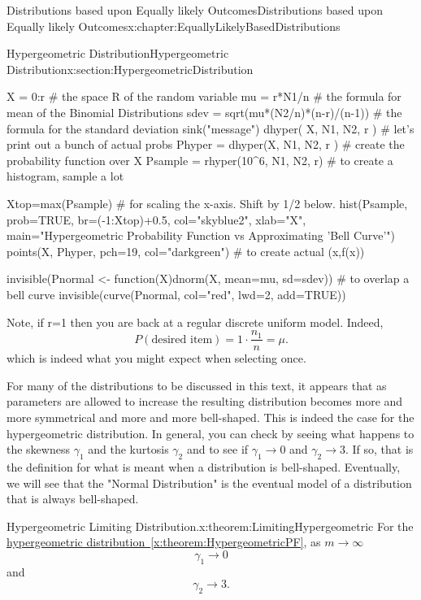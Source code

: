 \documentclass[oneside,10pt,]{book}
\newcommand{\xreffont}{\relax}
\numberwithin{equation}{section}
\begin{document}
\begin{chapterptx}{Distributions based upon Equally likely Outcomes}{}{Distributions based upon Equally likely Outcomes}{}{}{x:chapter:EquallyLikelyBasedDistributions}
\begin{sectionptx}{Hypergeometric Distribution}{}{Hypergeometric Distribution}{}{}{x:section:HypergeometricDistribution}
\begin{sageinput}
X = 0:r        # the space R of the random variable 
mu = r*N1/n      # the formula for mean of the Binomial Distributions
sdev = sqrt(mu*(N2/n)*(n-r)/(n-1))  # the formula for the standard deviation
sink("message")
dhyper( X, N1, N2, r )   # let's print out a bunch of actual probs
Phyper = dhyper(X, N1, N2, r )  # create the probability function over X
Psample = rhyper(10^6, N1, N2, r)  # to create a histogram, sample a lot

Xtop=max(Psample)          # for scaling the x-axis. Shift by 1/2 below.
hist(Psample, prob=TRUE, br=(-1:Xtop)+0.5, col="skyblue2", xlab="X", 
  main="Hypergeometric Probability Function vs Approximating 'Bell Curve'")
points(X, Phyper, pch=19, col="darkgreen")  # to create actual (x,f(x))

invisible(Pnormal <- function(X){dnorm(X, mean=mu, sd=sdev)})   # to overlap a bell curve
invisible(curve(Pnormal, col="red", lwd=2, add=TRUE))
\end{sageinput}
Note, if r=1 then you are back at a regular discrete uniform model. Indeed,%
\begin{equation*}
P(\text{desired item}) = 1 \cdot \frac{n_1}{n} = \mu .
\end{equation*}
which is indeed what you might expect when selecting once.%
\par
For many of the distributions to be discussed in this text, it appears that as parameters are allowed to increase the resulting distribution becomes more and more symmetrical and more and more bell-shaped. This is indeed the case for the hypergeometric distribution.  In general, you can check by seeing what happens to the skewness \(\gamma_1\) and the kurtosis \(\gamma_2\) and to see if \(\gamma_1 \rightarrow 0\) and \(\gamma_2 \rightarrow 3\).  If so, that is the definition for what is meant when a distribution is bell-shaped. Eventually, we will see that the "Normal Distribution" is the eventual model of a distribution that is always bell-shaped.%
\begin{theorem}{Hypergeometric Limiting Distribution.}{}{x:theorem:LimitingHypergeometric}%
For the \hyperref[x:theorem:HypergeometricPF]{hypergeometric distribution~{\xreffont\ref{x:theorem:HypergeometricPF}}}, as \(m \rightarrow \infty\)%
\begin{equation*}
\gamma_1 \rightarrow 0
\end{equation*}
and%
\begin{equation*}
\gamma_2 \rightarrow 3.
\end{equation*}
%
\end{theorem}

\end{sectionptx}
\end{chapterptx}
\end{document}
